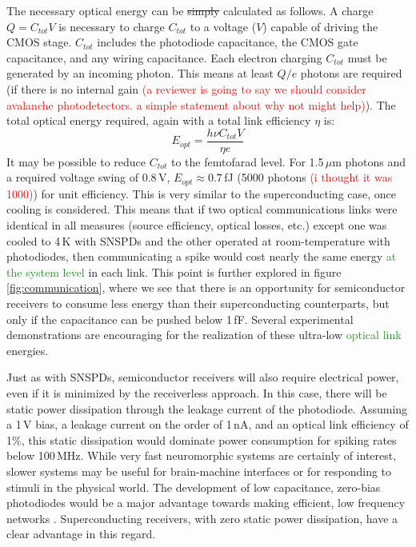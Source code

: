 \documentclass[twocolumn]{article}
\begin{document}
The necessary optical energy can be \sout{simply} calculated as follows. A charge $Q = C_{tot}V$ is necessary to charge $C_{tot}$ to a voltage ($V$) capable of driving the CMOS stage. $C_{tot}$ includes the photodiode capacitance, the CMOS gate capacitance, and any wiring capacitance. Each electron charging $C_{tot}$ must be generated by an incoming photon. This means at least $Q/e$ photons are required (if there is no internal gain \textcolor{red}{(a reviewer is going to say we should consider avalanche photodetectors. a simple statement about why not might help)}). The total optical energy required, again with a total link efficiency $\eta$ is:
\begin{equation}
    E_{opt} = \frac{h \nu C_{tot} V}{\eta e}
\end{equation}
It may be possible to reduce $C_{tot}$ to the femtofarad level. For 1.5\,$\mu$m photons and a required voltage swing of 0.8\,V, $E_{opt} \approx 0.7 $\,fJ (5000 photons \textcolor{red}{(i thought it was 1000)}) for unit efficiency. This is very similar to the superconducting case, once cooling is considered. This means that if two optical communications links were identical in all measures (source efficiency, optical losses, etc.) except one was cooled to 4\,K with SNSPDs and the other operated at room-temperature with photodiodes, then communicating a spike would cost nearly the same energy \textcolor{ForestGreen}{at the system level} in each link. This point is further explored in figure \ref{fig:communication}, where we see that there is an opportunity for semiconductor receivers to consume less energy than their superconducting counterparts, but only if the capacitance can be pushed below 1\,fF. Several experimental demonstrations are encouraging for the realization of these ultra-low \textcolor{ForestGreen}{optical link} energies.

Just as with SNSPDs, semiconductor receivers will also require electrical power, even if it is minimized by the receiverless approach. In this case, there will be static power dissipation through the leakage current of the photodiode. Assuming a 1\,V bias, a leakage current on the order of 1\,nA, and an optical link efficiency of 1\%, this static dissipation would dominate power consumption for spiking rates below 100\,MHz. While very fast neuromorphic systems are certainly of interest, slower systems may be useful for brain-machine interfaces or for responding to stimuli in the physical world. The development of low capacitance, zero-bias photodiodes would be a major advantage towards making efficient, low frequency networks \cite{nozaki2018forward}. Superconducting receivers, with zero static power dissipation, have a clear advantage in this regard.
\end{document}
